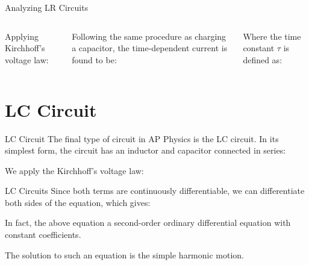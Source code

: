 \documentclass[12pt,aspectratio=169]{beamer}
\begin{document}
\begin{frame}{Analyzing LR Circuits}
  \begin{columns}

    Applying Kirchhoff's voltage law:


    Following the same procedure as charging a capacitor, the time-dependent
    current is found to be:


    Where the time constant $\tau$ is defined as:
    
  \end{columns}
\end{frame}



\section{LC Circuit}

\begin{frame}{LC Circuit}
  The final type of circuit in AP Physics is the LC circuit. In its simplest
  form, the circuit has an inductor and capacitor connected in series:
  \begin{center}
  \end{center}
  We apply the Kirchhoff's voltage law:
  
\end{frame}

\begin{frame}{LC Circuits}
  Since both terms are continuously differentiable, we can differentiate both
  sides of the equation, which gives:


  In fact, the above equation a second-order ordinary differential equation
  with constant coefficients.


  The solution to such an equation is the simple harmonic motion.
%
%
%
%

\end{frame}
\end{document}
